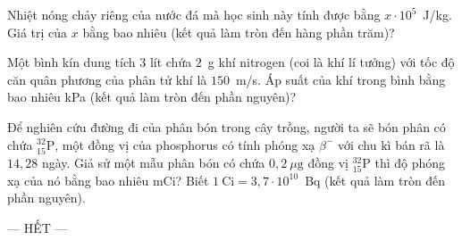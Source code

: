 \begin{ex}
\begin{center}
\begin{tikzpicture}[x=0.015cm,y=-0.015cm,line join=round,line cap=round,font=\footnotesize]
			\end{tikzpicture}
		\end{center}
		Nhiệt nóng chảy riêng của nước đá mà học sinh này tính được bằng $x\cdot 10^5$~J/kg. Giá trị của $x$ bằng bao nhiêu (kết quả làm tròn đến hàng phần trăm)?
		\par
	\end{ex}

	\begin{ex}%
		Một bình kín dung tích $3$ lít chứa $2$~g khí nitrogen (coi là khí lí tưởng) với tốc độ căn quân phương của phân tử khí là $150$~m/s. Áp suất của khí trong bình bằng bao nhiêu kPa (kết quả làm tròn đến phần nguyên)?
		\par
	\end{ex}

	\begin{ex}%
		Để nghiên cứu đường đi của phân bón trong cây trồng, người ta sẽ bón phân có chứa ${}^{32}_{15}\text{P}$, một đồng vị của phosphorus có tính phóng xạ $\beta^-$ với chu kì bán rã là $14{,}28$ ngày. Giả sử một mẫu phân bón có chứa $0{,}2~\mu\text{g}$ đồng vị ${}^{32}_{15}\text{P}$ thì độ phóng xạ của nó bằng bao nhiêu mCi? Biết $1~\text{Ci}=3{,}7\cdot 10^{10}$~Bq (kết quả làm tròn đến phần nguyên).
		\par
	\end{ex}

	\centerline{--- HẾT ---}


